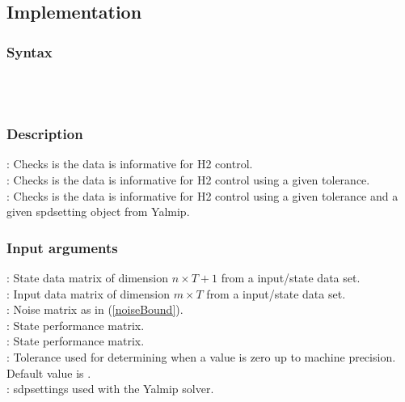 \subsection{Implementation}
\subsubsection*{Syntax} 
 \\
 \\

\subsubsection*{Description}
: Checks is the data is informative for \mbox{H2} control. \\
: Checks is the data is informative for \mbox{H2} control using a given tolerance. \\
: Checks is the data is informative for \mbox{H2} control using a given tolerance and a given spdsetting object from Yalmip.

\subsubsection*{Input arguments}
\textbf{}: State data matrix of dimension $n \times T+1$ from a input/state data set.\\
\textbf{}: Input data matrix of dimension $m \times T$ from a input/state data set.\\
\textbf{}: Noise matrix as in (\ref{noiseBound}). \\ 
\textbf{}: State performance matrix. \\ 
\textbf{}: State performance matrix. \\ 
\textbf{}: Tolerance used for determining when a value is zero up to machine precision. Default value is .\\
\textbf{}: sdpsettings used with the Yalmip solver.

